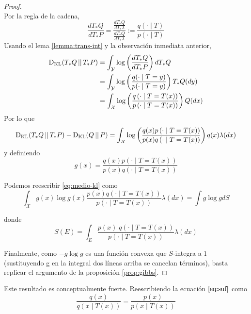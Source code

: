 \documentclass[main.tex]{subfiles}
\begin{document}
\begin{proof} $\ $ \\
	Por la regla de la cadena, 
	\begin{equation*}
		\frac{dT_*Q}{dT_*P}=\frac{\frac{dT_*Q}{dT_*\lambda}}{\frac{dT_*Q}{dT_*\lambda}}
		:= \frac{q(\cdot\mid T)}{p(\cdot\mid T)}
	\end{equation*}
	Usando el lema \ref{lemma:trans-int} y la observación inmediata anterior,
	\begin{align*}
		\operatorname*{D_{KL}}(T_*Q\operatorname*{\mid\mid} T_*P) &= \int_\mathcal{Y}\log\left(
			\frac{dT_*Q}{dT_*P}\right)dT_*Q \\
		&= \int_\mathcal{Y} \log\left(
			\frac{q(\cdot\mid T=y)}{p(\cdot\mid T=y)}\right)T_*Q(dy) \\
		&= \int_\mathcal{X}\log\left(\frac{q\left(
			\cdot\mid T=T(x)\right)}{p\left(\cdot\mid T=T(x)\right)}\right)Q(dx) \\
	\end{align*}
	Por lo que 
	\begin{equation}\label{eq:medio-kl}
		\operatorname*{D_{KL}}(T_*Q\operatorname*{\mid\mid} T_*P)-\operatorname*{D_{KL}}(Q\operatorname*{\mid\mid} P)
		=\int_\mathcal{X} \log\left(
		\frac{q(x)p\left(\cdot\mid T= T(x)\right)}{p(x)q\left(\cdot\mid T=T(x)\right)}
		\right)q(x)\lambda(dx) \\
	\end{equation}
	y definiendo
	\begin{equation*}
		g(x)=\frac{q(x)p\left(\cdot\mid T=T(x)\right)}
		{p(x)q\left(\cdot\mid T=T(x)\right)}
	\end{equation*}

	Podemos reescribir \eqref{eq:medio-kl} como
	\begin{equation*}
		\int_\mathcal{X}g(x)\log g(x)
		\frac{p(x)q( \cdot \mid T=T(x))}{p( \cdot\mid T=T(x))}\lambda(dx)
		= \int g \log g dS
	\end{equation*}

	donde 
	\begin{equation*}
	S(E) = \int_E \frac{p(x)\; 
	q(\cdot \mid T=T(x))}{p\left(\cdot \mid T=T(x)\right)}\lambda(dx)
	\end{equation*}

	Finalmente, como $-g\log g$ es una función convexa que $S$-integra a $1$
	(sustituyendo g en la integral dos líneas arriba se cancelan términos), basta
	replicar el argumento de la proposición \ref{prop:gibbs}.
\end{proof}

Este resultado es conceptualmente fuerte. Reescribiendo la ecuación
$\eqref{eq:suf}$ como 
\begin{equation*}
	\frac{q(x)}{q(x\mid T(x))} = \frac{p(x)}{p(x\mid T(x))}
\end{equation*}
\end{document}
